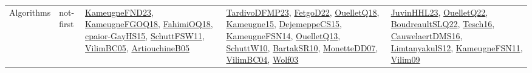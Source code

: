 {\begin{longtable}{lp{3cm}>{\raggedright}p{6cm}>{\raggedright}p{6cm}p{8cm}}
Algorithms & not-first & \href{papers/KameugneFND23.pdf}{KameugneFND23}\cite{KameugneFND23}, \href{papers/KameugneFGOQ18.pdf}{KameugneFGOQ18}\cite{KameugneFGOQ18}, \href{articles/FahimiOQ18.pdf}{FahimiOQ18}\cite{FahimiOQ18}, \href{papers/cpaior-GayHS15.pdf}{cpaior-GayHS15}\cite{cpaior-GayHS15}, \href{articles/SchuttFSW11.pdf}{SchuttFSW11}\cite{SchuttFSW11}, \href{articles/VilimBC05.pdf}{VilimBC05}\cite{VilimBC05}, \href{papers/ArtiouchineB05.pdf}{ArtiouchineB05}\cite{ArtiouchineB05} & \href{papers/TardivoDFMP23.pdf}{TardivoDFMP23}\cite{TardivoDFMP23}, \href{articles/FetgoD22.pdf}{FetgoD22}\cite{FetgoD22}, \href{papers/OuelletQ18.pdf}{OuelletQ18}\cite{OuelletQ18}, \href{articles/Kameugne15.pdf}{Kameugne15}\cite{Kameugne15}, \href{papers/DejemeppeCS15.pdf}{DejemeppeCS15}\cite{DejemeppeCS15}, \href{articles/KameugneFSN14.pdf}{KameugneFSN14}\cite{KameugneFSN14}, \href{papers/OuelletQ13.pdf}{OuelletQ13}\cite{OuelletQ13}, \href{papers/SchuttW10.pdf}{SchuttW10}\cite{SchuttW10}, \href{articles/BartakSR10.pdf}{BartakSR10}\cite{BartakSR10}, \href{papers/MonetteDD07.pdf}{MonetteDD07}\cite{MonetteDD07}, \href{papers/VilimBC04.pdf}{VilimBC04}\cite{VilimBC04}, \href{papers/Wolf03.pdf}{Wolf03}\cite{Wolf03} & \href{papers/JuvinHHL23.pdf}{JuvinHHL23}\cite{JuvinHHL23}, \href{papers/OuelletQ22.pdf}{OuelletQ22}\cite{OuelletQ22}, \href{papers/BoudreaultSLQ22.pdf}{BoudreaultSLQ22}\cite{BoudreaultSLQ22}, \href{papers/Tesch16.pdf}{Tesch16}\cite{Tesch16}, \href{papers/CauwelaertDMS16.pdf}{CauwelaertDMS16}\cite{CauwelaertDMS16}, \href{articles/LimtanyakulS12.pdf}{LimtanyakulS12}\cite{LimtanyakulS12}, \href{papers/KameugneFSN11.pdf}{KameugneFSN11}\cite{KameugneFSN11}, \href{papers/Vilim09.pdf}{Vilim09}\cite{Vilim09}\\

\end{longtable}}
